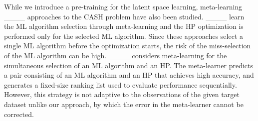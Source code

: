 

While we introduce a pre-training for the latent space learning, meta-learning ____ approaches to the CASH problem have also been studied.
%
____ learn the ML algorithm selection through meta-learning and the HP optimization is performed only for the selected ML algorithm.
%
Since these approaches select a single ML algorithm before the optimization starts, the risk of the miss-selection of the ML algorithm can be high.
%
____ considers meta-learning for the simultaneous selection of an ML algorithm and an HP.
%
The meta-learner predicts a pair consisting of an ML algorithm and an HP that achieves high accuracy, and generates a fixed-size ranking list used to evaluate performance sequentially.
%
However, this strategy is not adaptive to the observations of the given target dataset unlike our approach, by which the error in the meta-learner cannot be corrected. %



